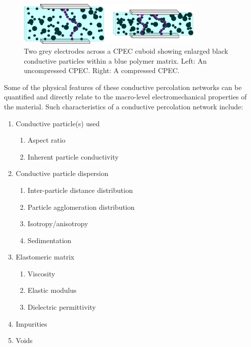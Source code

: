 \begin{figure}[H]
    \centering
    \includegraphics[width=9cm]{Figures/res_deformed_states_x2_crop.jpg}
    \caption{Two grey electrodes across a CPEC cuboid showing enlarged black conductive particles within a blue polymer matrix. Left: An uncompressed CPEC. Right: A compressed CPEC.}
    \label{fig:res_deformed_cube}
\end{figure}

Some of the physical features of these conductive percolation networks can be quantified and directly relate to the macro-level electromechanical properties of the material. Such characteristics of a conductive percolation network include:
\begin{enumerate}
    \item Conductive particle(s) used
    \begin{enumerate}
        \item Aspect ratio \cite{Wu2019,Flandin1999}
        \item Inherent particle conductivity
    \end{enumerate}
    \item Conductive particle dispersion \cite{Kim2012}
    \begin{enumerate}
        \item Inter-particle distance distribution
        \item Particle agglomeration distribution \cite{Pegel2008}
        \item Isotropy/anisotropy \cite{Song2022}
        \item Sedimentation \cite{Eklund2019}
    \end{enumerate}
    \item Elastomeric matrix
    \begin{enumerate}
        \item Viscosity
        \item Elastic modulus
        \item Dielectric permittivity
    \end{enumerate}
    \item Impurities
    \item Voids
\end{enumerate}

